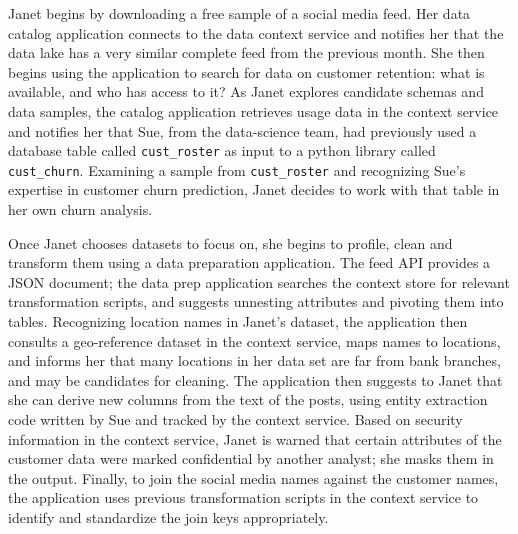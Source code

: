 \documentclass{sig-alternate}
\begin{document}
Janet 
begins by downloading a free sample of a social media feed. Her data catalog application connects to the data context service  
and notifies her that the data lake has a very similar complete feed from the previous month. 
She then begins using the application to search for data on customer retention: what is available, and who has access to it?  
As Janet explores candidate schemas and data samples, the catalog application retrieves usage data in the context service and notifies her that Sue, from the data-science team, had previously used a database table called \verb|cust_roster| as input to a python library called \verb|cust_churn|.
Examining a sample from \verb|cust_roster| and recognizing Sue's expertise in customer churn prediction,
Janet decides to work with that table in her own churn analysis.  

Once Janet chooses datasets to focus on, she begins to profile, clean and transform them using a data preparation application. The feed API provides a  JSON document; the data prep application searches the context store for relevant transformation scripts, and suggests unnesting attributes and pivoting them into tables.
Recognizing location names in Janet's dataset, the application then consults a geo-reference dataset in the context service, maps names to locations, and informs her that many locations in her data set are far from bank branches, and may be candidates for cleaning. 
The application then suggests to Janet that she can derive new columns from the text of the posts, using entity extraction code written by Sue and tracked by the context service. 
Based on security information in the context service, Janet is warned that certain attributes of the customer data were marked confidential by another analyst; she masks them in the output. 
Finally, to join the social media names against the customer names, the application uses previous transformation scripts in the context service to identify and standardize the join keys appropriately.
\end{document}
